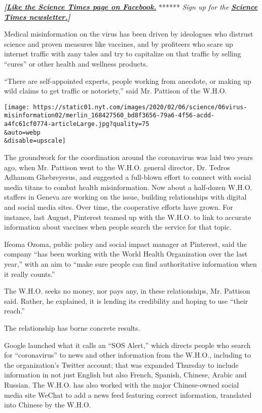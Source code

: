 \textbf{\emph{{[}}\href{http://on.fb.me/1paTQ1h}{\emph{Like the Science
Times page on Facebook.}}} ****** \emph{\textbar{} Sign up for the}
\textbf{\href{http://nyti.ms/1MbHaRU}{\emph{Science Times
newsletter.}}\emph{{]}}}

Medical misinformation on the virus has been driven by ideologues who
distrust science and proven measures like vaccines, and by profiteers
who scare up internet traffic with zany tales and try to capitalize on
that traffic by selling ``cures'' or other health and wellness products.

``There are self-appointed experts, people working from anecdote, or
making up wild claims to get traffic or notoriety,'' said Mr. Pattison
of the W.H.O.

\texttt{[image: https://static01.nyt.com/images/2020/02/06/science/06virus-misinformation02/merlin\_168427560\_bd8f3656-79a6-4f56-acdd-a4fc61cf0774-articleLarge.jpg?quality=75\\\&auto=webp\\\&disable=upscale]}

The groundwork for the coordination around the coronavirus was laid two
years ago, when Mr. Pattison went to the W.H.O. general director, Dr.
Tedros Adhanom Ghebreyesus, and suggested a full-blown effort to connect
with social media titans to combat health misinformation. Now about a
half-dozen W.H.O. staffers in Geneva are working on the issue, building
relationships with digital and social media sites. Over time, the
cooperative efforts have grown. For instance, last August, Pinterest
teamed up with the W.H.O. to link to accurate information about vaccines
when people search the service for that topic.

Ifeoma Ozoma, public policy and social impact manager at Pinterest, said
the company ``has been working with the World Health Organization over
the last year,'' with an aim to ``make sure people can find
authoritative information when it really counts.''

The W.H.O. seeks no money, nor pays any, in these relationships, Mr.
Pattison said. Rather, he explained, it is lending its credibility and
hoping to use ``their reach.''

The relationship has borne concrete results.

Google launched what it calls an ``SOS Alert,'' which directs people who
search for ``coronavirus'' to news and other information from the
W.H.O., including to the organization's Twitter account; that was
expanded Thursday to include information in not just English but also
French, Spanish, Chinese, Arabic and Russian. The W.H.O. has also worked
with the major Chinese-owned social media site WeChat to add a news feed
featuring correct information, translated into Chinese by the W.H.O.

